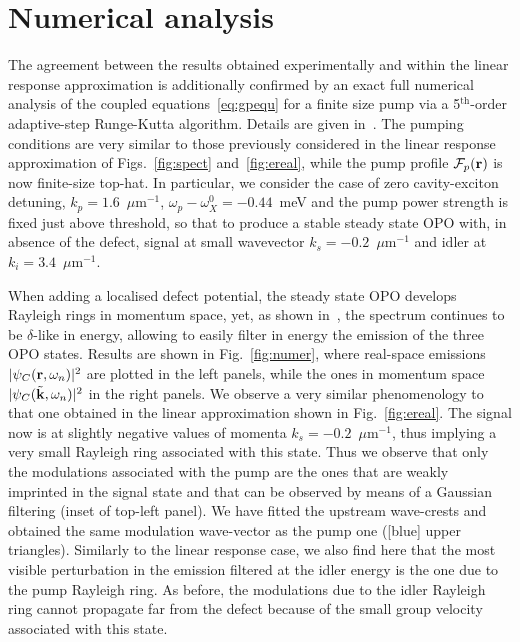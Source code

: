 \section{Numerical analysis}
%
The agreement between the results obtained experimentally and within
the linear response approximation is additionally confirmed by an
exact full numerical analysis of the coupled
equations~\eqref{eq:gpequ} for a finite size pump via a
5$^{\text{th}}$-order adaptive-step Runge-Kutta algorithm.
%
Details are given in~\cite{SM}.
%
The pumping conditions are very similar to those previously considered
in the linear response approximation of Figs.~\ref{fig:spect}
and~\ref{fig:ereal}, while the pump profile $\mathcal{F}_p({\mathbf r})$
is now finite-size top-hat. In particular, we consider the case of
zero cavity-exciton detuning, $k_p=1.6$~$\mu$m$^{-1}$,
$\omega_p-\omega_X^0 = -0.44$~meV and the pump power strength is fixed
just above threshold, so that to produce a stable steady state OPO
with, in absence of the defect, signal at small wavevector
$k_s=-0.2$~$\mu$m$^{-1}$ and idler at $k_i=3.4$~$\mu$m$^{-1}$.

When adding a localised defect potential, the steady state OPO
develops Rayleigh rings in momentum space, yet, as shown in~\cite{SM},
the spectrum continues to be $\delta$-like in energy, allowing to
easily filter in energy the emission of the three OPO states.
%
Results are shown in Fig.~\ref{fig:numer}, where real-space emissions
$|\psi_C ({\mathbf r},\omega_n)|^2$ are plotted in the left panels, while
the ones in momentum space $|\psi_C (\tilde{{\mathbf k}},\omega_n)|^2$ in
the right panels. We observe a very similar phenomenology to that one
obtained in the linear approximation shown in
Fig.~\ref{fig:ereal}. The signal now is at slightly negative values of
momenta $k_s=-0.2$~$\mu$m$^{-1}$, thus implying a very small Rayleigh
ring associated with this state. Thus we observe that only the
modulations associated with the pump are the ones that are weakly
imprinted in the signal state and that can be observed by means of a
Gaussian filtering (inset of top-left panel). We have fitted the
upstream wave-crests and obtained the same modulation wave-vector as
the pump one ([blue] upper triangles). Similarly to the linear
response case, we also find here that the most visible perturbation in
the emission filtered at the idler energy is the one due to the pump
Rayleigh ring. As before, the modulations due to the idler Rayleigh
ring cannot propagate far from the defect because of the small group
velocity associated with this state.

